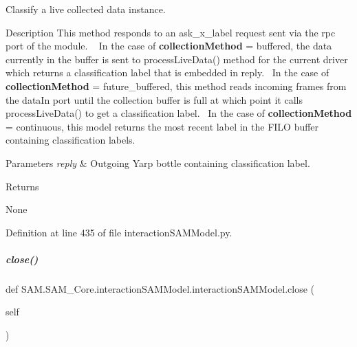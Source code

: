 Classify a live collected data instance. 

\begin{DoxyParagraph}{Description}
This method responds to an {\ttfamily ask\+\_\+x\+\_\+label} request sent via the rpc port of the module. ~\newline
 In the case of {\bfseries collection\+Method} = {\ttfamily buffered}, the data currently in the buffer is sent to process\+Live\+Data() method for the current driver which returns a classification label that is embedded in reply.~\newline
 In the case of {\bfseries collection\+Method} = {\ttfamily future\+\_\+buffered}, this method reads incoming frames from the {\ttfamily data\+In} port until the collection buffer is full at which point it calls process\+Live\+Data() to get a classification label.~\newline
 In the case of {\bfseries collection\+Method} = {\ttfamily continuous}, this model returns the most recent label in the F\+I\+LO buffer containing classification labels.~\newline

\end{DoxyParagraph}

\begin{DoxyParams}{Parameters}
{\em reply} & Outgoing Yarp bottle containing classification label.\\
\hline
\end{DoxyParams}
\begin{DoxyReturn}{Returns}


None 
\end{DoxyReturn}


Definition at line 435 of file interaction\+S\+A\+M\+Model.\+py.

\mbox{\label{group__icubclient__SAM__Core_a347c3010f6cd5f9280819be41ec39bf1}} 
\subparagraph{\texorpdfstring{close()}{close()}}
{\footnotesize\ttfamily def S\+A\+M.\+S\+A\+M\+\_\+\+Core.\+interaction\+S\+A\+M\+Model.\+interaction\+S\+A\+M\+Model.\+close (\begin{DoxyParamCaption}\item[{}]{self }\end{DoxyParamCaption})}



